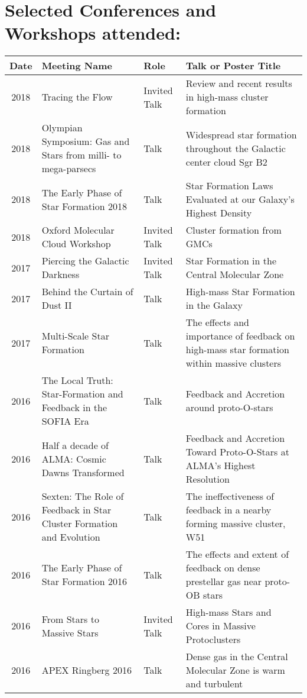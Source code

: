 \setlength{\extrarowheight}{4pt}
\section*{Selected Conferences and Workshops attended: }
\vspace{-12pt}
\begin{tabular}{cp{1.8in}p{1.5cm}p{3.0in}}
    Date & Meeting Name & Role & Talk or Poster Title \\
                \hline
    2018 &      Tracing the Flow & Invited Talk & Review and recent results in high-mass cluster formation \\
    2018 &      Olympian Symposium: Gas and Stars from milli- to mega-parsecs & Talk & 	Widespread star formation throughout the Galactic center cloud Sgr B2 \\
    2018 &      The Early Phase of Star Formation 2018 & Talk & Star Formation Laws Evaluated at our Galaxy's Highest Density \\
    2018 &      Oxford Molecular Cloud Workshop & Invited Talk & Cluster formation from GMCs \\
    2017 &      Piercing the Galactic Darkness & Invited Talk & Star Formation in the Central Molecular Zone \\
    2017 &      Behind the Curtain of Dust II & Talk & High-mass Star Formation in the Galaxy \\
    2017 &      Multi-Scale Star Formation & Talk & The effects and importance of feedback on high-mass star formation within massive clusters \\
    2016 &      The Local Truth: Star-Formation and Feedback in the SOFIA Era & Talk & Feedback and Accretion around proto-O-stars \\
    2016 &      Half a decade of ALMA: Cosmic Dawns Transformed & Talk & Feedback and Accretion Toward Proto-O-Stars at ALMA's Highest Resolution \\
    2016 &      Sexten: The Role of Feedback in Star Cluster Formation and Evolution  & Talk & The ineffectiveness of feedback in a nearby forming massive cluster, W51 \\
    2016 &      The Early Phase of Star Formation 2016 & Talk & The effects and extent of feedback on dense prestellar gas near proto-OB stars \\
    2016 &      From Stars to Massive Stars & Invited Talk & High-mass Stars and Cores in Massive Protoclusters \\
    2016 &      APEX Ringberg 2016 & Talk & Dense gas in the Central Molecular Zone is warm and turbulent \\

\end{tabular}
